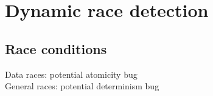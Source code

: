\chapter{Dynamic race detection}
\section{Race conditions}
Data races: potential atomicity bug \\
General races: potential determinism bug
